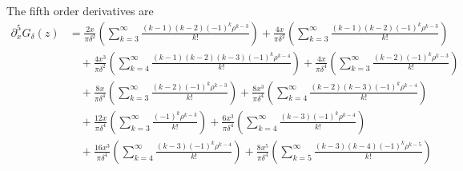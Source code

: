 \documentclass[12pt]{amsart}
\begin{document}
The fifth order derivatives are
\begin{align*}
	\partial_{x}^5 G_\delta(z) &= \frac{2x}{\pi \delta^2} \left( \sum_{k=3}^\infty \frac{ (k-1) (k-2) (-1)^k \rho^{k-3} }{ k!} \right) 
		+ \frac{4x}{\pi \delta^2} \left( \sum_{k=3}^\infty \frac{ (k-1) (k-2) (-1)^k \rho^{k-3} }{ k!} \right) \\
&\quad	+ \frac{4x^3}{\pi \delta^2} \left( \sum_{k=4}^\infty \frac{ (k-1) (k-2) (k-3) (-1)^k \rho^{k-4} }{ k!} \right)
		+  \frac{4x}{\pi \delta^4} \left( \sum_{k=3}^\infty \frac{  (k-2) (-1)^k \rho^{k-3} }{ k!} \right) \\
&\quad	+  \frac{8x}{\pi \delta^4} \left( \sum_{k=3}^\infty \frac{  (k-2) (-1)^k \rho^{k-3} }{ k!} \right) 
		+  \frac{8x^3}{\pi \delta^4} \left( \sum_{k=4}^\infty \frac{  (k-2)(k-3) (-1)^k \rho^{k-4} }{ k!} \right) \\
&\quad	+ \frac{12x}{\pi \delta^4} \left( \sum_{k=3}^\infty \frac{  (-1)^k \rho^{k-3} }{ k!} \right) 
		+ \frac{6x^3}{\pi \delta^4} \left( \sum_{k=4}^\infty \frac{  (k-3) (-1)^k \rho^{k-4} }{ k!} \right) \\
&\quad	+ \frac{16x^3}{\pi \delta^4} \left( \sum_{k=4}^\infty \frac{  (k-3) (-1)^k \rho^{k-4} }{ k!} \right) 
		+ \frac{8x^5}{\pi \delta^4} \left( \sum_{k=5}^\infty \frac{  (k-3) (k-4) (-1)^k \rho^{k-5} }{ k!} \right) 
\end{align*}



\end{document}
